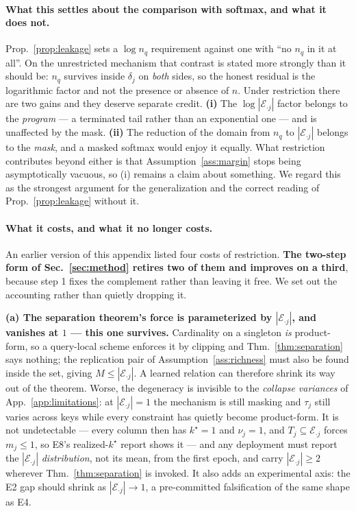 \documentclass{article}
\begin{document}
\paragraph{What this settles about the comparison with softmax, and what it does not.}
Prop.~\ref{prop:leakage} sets a $\log n_q$ requirement against one with ``no $n_q$ in it at
all''. On the unrestricted mechanism that contrast is stated more strongly than it should be:
$n_q$ survives inside $\delta_j$ on \emph{both} sides, so the honest residual is the logarithmic
factor and not the presence or absence of $n$. Under restriction there are two gains and they
deserve separate credit. \textbf{(i)} The $\log|\mathcal{E}_{\cdot j}|$ factor belongs to the
\emph{program} --- a terminated tail rather than an exponential one --- and is unaffected by the
mask. \textbf{(ii)} The reduction of the domain from $n_q$ to $|\mathcal{E}_{\cdot j}|$ belongs
to the \emph{mask}, and a masked softmax would enjoy it equally. What restriction contributes
beyond either is that Assumption~\ref{ass:margin} stops being asymptotically vacuous, so (i)
remains a claim about something. We regard this as the strongest argument for the generalization
and the correct reading of Prop.~\ref{prop:leakage} without it.

\paragraph{What it costs, and what it no longer costs.} An earlier version of this appendix
listed four costs of restriction. \textbf{The two-step form of Sec.~\ref{sec:method} retires two
of them and improves on a third}, because step 1 fixes the complement rather than leaving it free.
We set out the accounting rather than quietly dropping it.

\textbf{(a) The separation theorem's force is parameterized by $|\mathcal{E}_{\cdot j}|$, and
vanishes at $1$ --- this one survives.} Cardinality on a singleton \emph{is} product-form, so a
query-local scheme enforces it by clipping and Thm.~\ref{thm:separation} says nothing; the
replication pair of Assumption~\ref{ass:richness} must also be found inside the set, giving
$M\le|\mathcal{E}_{\cdot j}|$. A learned relation can therefore shrink its way out of the theorem.
Worse, the degeneracy is invisible to the \emph{collapse variances} of
App.~\ref{app:limitations}: at $|\mathcal{E}_{\cdot j}|=1$ the mechanism is still masking and
$\tau_j$ still varies across keys while every constraint has quietly become product-form. It is
not undetectable --- every column then has $k^\star=1$ and $\nu_j=1$, and
$T_j\subseteq\mathcal{E}_{\cdot j}$ forces $m_j\le1$, so E8's realized-$k^\star$ report shows it
--- and any deployment must report the $|\mathcal{E}_{\cdot j}|$ \emph{distribution}, not its
mean, from the first epoch, and carry $|\mathcal{E}_{\cdot j}|\ge2$ wherever
Thm.~\ref{thm:separation} is invoked. It also adds an experimental axis: the E2 gap should shrink
as $|\mathcal{E}_{\cdot j}|\to1$, a pre-committed falsification of the same shape as E4.
\end{document}
